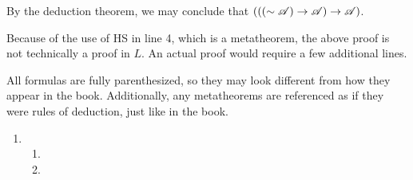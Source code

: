 \begin{proposition}
\begin{enumerate}[label=(\alph*), align=left]
      By the deduction theorem, we may conclude that \((((\sim\mathscr{A}) \rightarrow \mathscr{A}) \rightarrow \mathscr{A})\).

      \note{} Because of the use of HS in line 4, which is a metatheorem, the above proof is not technically a proof in \(L\). An actual proof would require a few additional lines.
  \end{enumerate}
\end{proposition}

\solutions{}

\note{} All formulas are fully parenthesized, so they may look different from how they appear in the book. Additionally, any metatheorems are referenced as if they were rules of deduction, just like in the book.
%
\begin{enumerate}
  \item %
    \begin{enumerate}[label=(\alph*), align=left]
      \item

      \item \footnotesize
      \normalsize


\end{enumerate}
\end{enumerate}
